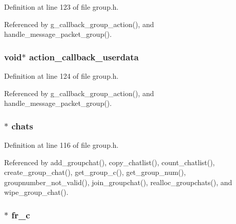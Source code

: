 Definition at line 123 of file group.\+h.



Referenced by g\+\_\+callback\+\_\+group\+\_\+action(), and handle\+\_\+message\+\_\+packet\+\_\+group().

\hypertarget{struct_group___chats_ab8194101242ca87c3ee0fd11f7717569}{
\subsubsection[{action\+\_\+callback\+\_\+userdata}]{\setlength{\rightskip}{0pt plus 5cm}void$\ast$ action\+\_\+callback\+\_\+userdata}}\label{struct_group___chats_ab8194101242ca87c3ee0fd11f7717569}


Definition at line 124 of file group.\+h.



Referenced by g\+\_\+callback\+\_\+group\+\_\+action(), and handle\+\_\+message\+\_\+packet\+\_\+group().

\hypertarget{struct_group___chats_a2a89a032b3d68d95f8cbecf4ecec9e74}{
\subsubsection[{chats}]{$\ast$ chats}}\label{struct_group___chats_a2a89a032b3d68d95f8cbecf4ecec9e74}


Definition at line 116 of file group.\+h.



Referenced by add\+\_\+groupchat(), copy\+\_\+chatlist(), count\+\_\+chatlist(), create\+\_\+group\+\_\+chat(), get\+\_\+group\+\_\+c(), get\+\_\+group\+\_\+num(), groupnumber\+\_\+not\+\_\+valid(), join\+\_\+groupchat(), realloc\+\_\+groupchats(), and wipe\+\_\+group\+\_\+chat().

\hypertarget{struct_group___chats_ae26eb43a606fff20fe70209d051c40f9}{
\subsubsection[{fr\+\_\+c}]{$\ast$ fr\+\_\+c}}\label{struct_group___chats_ae26eb43a606fff20fe70209d051c40f9}


